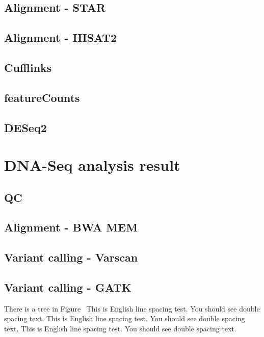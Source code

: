 \subsection{Alignment - STAR}

\subsection{Alignment - HISAT2}

\subsection{Cufflinks}

\subsection{featureCounts}

\subsection{DESeq2}


\section{DNA-Seq analysis result}

\subsection{QC}

\subsection{Alignment - BWA MEM}

\subsection{Variant calling - Varscan}

\subsection{Variant calling - GATK}

There is a tree in Figure~%
This is English line spacing test. You should see double spacing text.
This is English line spacing test. You should see double spacing text.
This is English line spacing test. You should see double spacing text.

%

